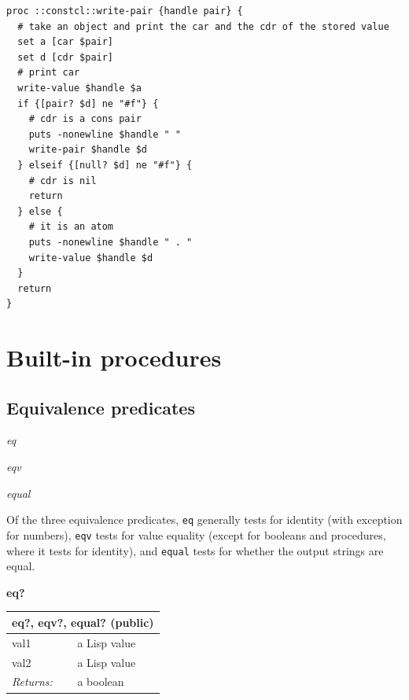 \documentclass[twoside,9pt]{report}
\begin{document}
\noindent\makebox[\linewidth]{\rule{\linewidth}{0.4pt}}
\begin{lstlisting}
proc ::constcl::write-pair {handle pair} {
  # take an object and print the car and the cdr of the stored value
  set a [car $pair]
  set d [cdr $pair]
  # print car
  write-value $handle $a
  if {[pair? $d] ne "#f"} {
    # cdr is a cons pair
    puts -nonewline $handle " "
    write-pair $handle $d
  } elseif {[null? $d] ne "#f"} {
    # cdr is nil
    return
  } else {
    # it is an atom
    puts -nonewline $handle " . "
    write-value $handle $d
  }
  return
}
\end{lstlisting}
\noindent\makebox[\linewidth]{\rule{\linewidth}{0.4pt}}
\chapter{Built-in procedures}
\label{built-in-procedures}
\section{Equivalence predicates}
\label{equivalence-predicates}

\emph{eq}


\emph{eqv}


\emph{equal}


Of the three equivalence predicates, \texttt{eq} generally tests for identity (with exception for numbers), \texttt{eqv} tests for value equality (except for booleans and procedures, where it tests for identity), and \texttt{equal} tests for whether the output strings are equal.


\textbf{eq?}

\begin{tabular}{ |l l| }
\hline
\multicolumn{2}{|l|}{eq?, eqv?, equal? (public)} \\
\hline
val1 & a Lisp value \\
val2 & a Lisp value \\
\textit{Returns:} & a boolean \\
\hline
\end{tabular}
\end{document}
